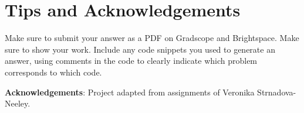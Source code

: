\documentclass[11pt]{article}
\begin{document}
    \hypertarget{tips-and-acknowledgements}{%
\section*{Tips and Acknowledgements}\label{tips-and-acknowledgements}}

Make sure to submit your answer as a PDF on Gradscope and Brightspace.
Make sure to show your work. Include any code snippets you used to
generate an answer, using comments in the code to clearly indicate which
problem corresponds to which code.

\textbf{Acknowledgements}: Project adapted from assignments of Veronika
Strnadova-Neeley.


    
    
    
\end{document}
